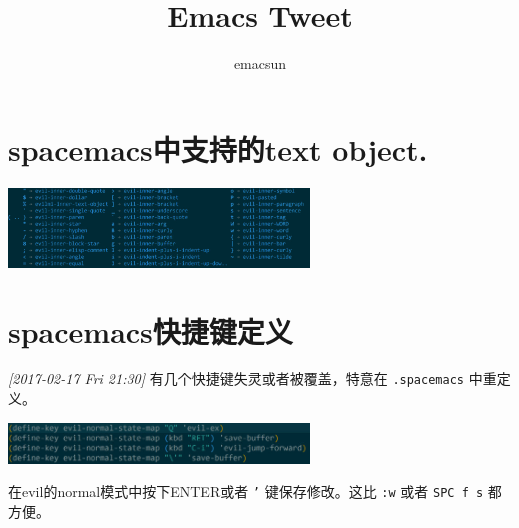 \documentclass[10pt,a4paper,UTF8]{article}
\author{emacsun}
\date{}
\title{Emacs Tweet}
\begin{document}
\maketitle
\tableofcontents
{}

\section{spacemacs中支持的text object.}
\label{sec:org7a107aa}

\begin{center}
\includegraphics[width=0.6\textwidth]{../../img/20170217spacemacsTxtObject.jpg}
\label{org30fc8b8}
\end{center}

\section{spacemacs快捷键定义}
\label{sec:org04d19d9}
\textit{[2017-02-17 Fri 21:30]}
有几个快捷键失灵或者被覆盖，特意在 \texttt{.spacemacs} 中重定义。
\begin{center}
\includegraphics[width=0.6\textwidth]{../../img/20170217spacemacsSeveralShortkey.jpg}
\label{org545a52c}
\end{center}

在evil的normal模式中按下ENTER或者 \texttt{'} 键保存修改。这比 \texttt{:w} 或者 \texttt{SPC f s} 都方便。
\end{document}
